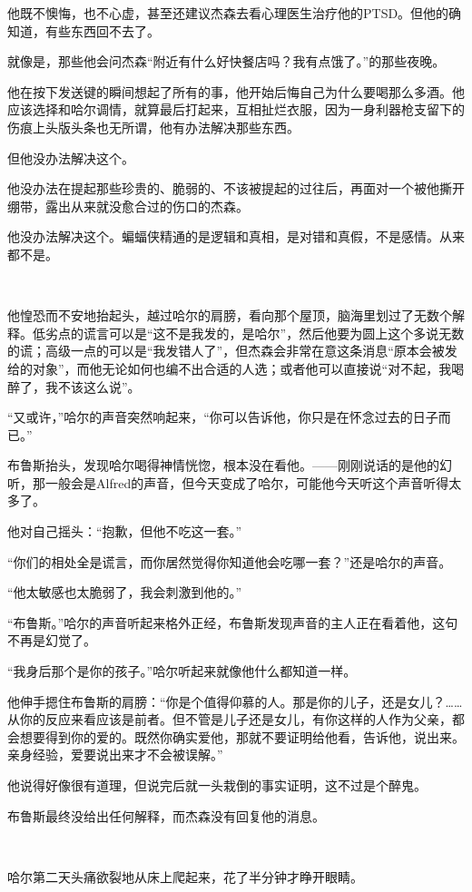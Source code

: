 \documentclass[../main.tex]{subfiles}
\begin{document}
他既不懊悔，也不心虚，甚至还建议杰森去看心理医生治疗他的PTSD。但他的确知道，有些东西回不去了。

就像是，那些他会问杰森“附近有什么好快餐店吗？我有点饿了。”的那些夜晚。

他在按下发送键的瞬间想起了所有的事，他开始后悔自己为什么要喝那么多酒。他应该选择和哈尔调情，就算最后打起来，互相扯烂衣服，因为一身利器枪支留下的伤痕上头版头条也无所谓，他有办法解决那些东西。

但他没办法解决这个。

他没办法在提起那些珍贵的、脆弱的、不该被提起的过往后，再面对一个被他撕开绷带，露出从来就没愈合过的伤口的杰森。

他没办法解决这个。蝙蝠侠精通的是逻辑和真相，是对错和真假，不是感情。从来都不是。

~\

他惶恐而不安地抬起头，越过哈尔的肩膀，看向那个屋顶，脑海里划过了无数个解释。低劣点的谎言可以是“这不是我发的，是哈尔”，然后他要为圆上这个多说无数的谎；高级一点的可以是“我发错人了”，但杰森会非常在意这条消息“原本会被发给的对象”，而他无论如何也编不出合适的人选；或者他可以直接说“对不起，我喝醉了，我不该这么说”。

“又或许，”哈尔的声音突然响起来，“你可以告诉他，你只是在怀念过去的日子而已。”

布鲁斯抬头，发现哈尔喝得神情恍惚，根本没在看他。——刚刚说话的是他的幻听，那一般会是Alfred的声音，但今天变成了哈尔，可能他今天听这个声音听得太多了。

他对自己摇头：“抱歉，但他不吃这一套。”

“你们的相处全是谎言，而你居然觉得你知道他会吃哪一套？”还是哈尔的声音。

“他太敏感也太脆弱了，我会刺激到他的。”

“布鲁斯。”哈尔的声音听起来格外正经，布鲁斯发现声音的主人正在看着他，这句不再是幻觉了。

“我身后那个是你的孩子。”哈尔听起来就像他什么都知道一样。

他伸手摁住布鲁斯的肩膀：“你是个值得仰慕的人。那是你的儿子，还是女儿？……从你的反应来看应该是前者。但不管是儿子还是女儿，有你这样的人作为父亲，都会想要得到你的爱的。既然你确实爱他，那就不要证明给他看，告诉他，说出来。亲身经验，爱要说出来才不会被误解。”

他说得好像很有道理，但说完后就一头栽倒的事实证明，这不过是个醉鬼。

布鲁斯最终没给出任何解释，而杰森没有回复他的消息。

~\

哈尔第二天头痛欲裂地从床上爬起来，花了半分钟才睁开眼睛。
\end{document}

